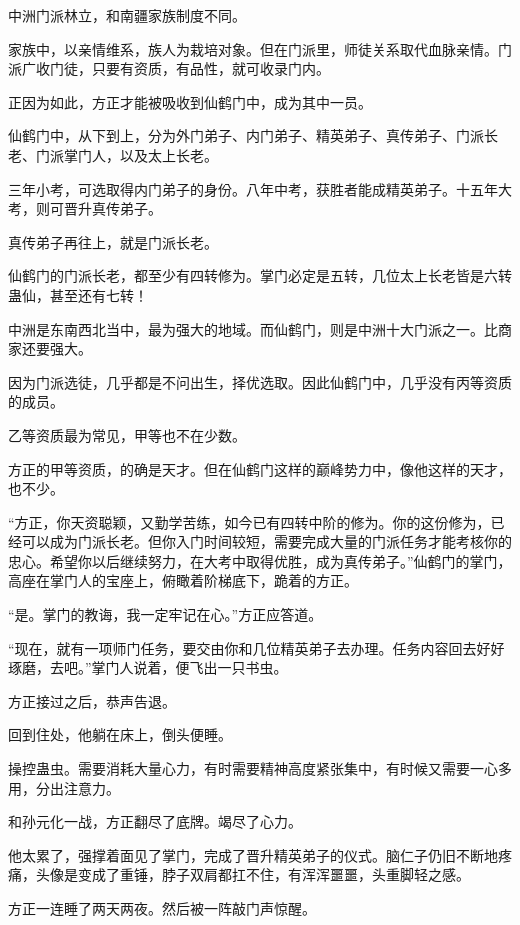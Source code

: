 
\begin{this_body}

中洲门派林立，和南疆家族制度不同。

家族中，以亲情维系，族人为栽培对象。但在门派里，师徒关系取代血脉亲情。门派广收门徒，只要有资质，有品性，就可收录门内。

正因为如此，方正才能被吸收到仙鹤门中，成为其中一员。

仙鹤门中，从下到上，分为外门弟子、内门弟子、精英弟子、真传弟子、门派长老、门派掌门人，以及太上长老。

三年小考，可选取得内门弟子的身份。八年中考，获胜者能成精英弟子。十五年大考，则可晋升真传弟子。

真传弟子再往上，就是门派长老。

仙鹤门的门派长老，都至少有四转修为。掌门必定是五转，几位太上长老皆是六转蛊仙，甚至还有七转！

中洲是东南西北当中，最为强大的地域。而仙鹤门，则是中洲十大门派之一。比商家还要强大。

因为门派选徒，几乎都是不问出生，择优选取。因此仙鹤门中，几乎没有丙等资质的成员。

乙等资质最为常见，甲等也不在少数。

方正的甲等资质，的确是天才。但在仙鹤门这样的巅峰势力中，像他这样的天才，也不少。

“方正，你天资聪颖，又勤学苦练，如今已有四转中阶的修为。你的这份修为，已经可以成为门派长老。但你入门时间较短，需要完成大量的门派任务才能考核你的忠心。希望你以后继续努力，在大考中取得优胜，成为真传弟子。”仙鹤门的掌门，高座在掌门人的宝座上，俯瞰着阶梯底下，跪着的方正。

“是。掌门的教诲，我一定牢记在心。”方正应答道。

“现在，就有一项师门任务，要交由你和几位精英弟子去办理。任务内容回去好好琢磨，去吧。”掌门人说着，便飞出一只书虫。

方正接过之后，恭声告退。

回到住处，他躺在床上，倒头便睡。

操控蛊虫。需要消耗大量心力，有时需要精神高度紧张集中，有时候又需要一心多用，分出注意力。

和孙元化一战，方正翻尽了底牌。竭尽了心力。

他太累了，强撑着面见了掌门，完成了晋升精英弟子的仪式。脑仁子仍旧不断地疼痛，头像是变成了重锤，脖子双肩都扛不住，有浑浑噩噩，头重脚轻之感。

方正一连睡了两天两夜。然后被一阵敲门声惊醒。


\end{this_body}
